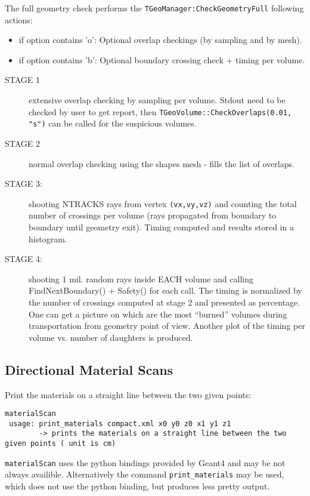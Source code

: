 The full geometry check performs the \texttt{TGeoManager:CheckGeometryFull} following actions:
\begin{itemize}
\item if option contains 'o': Optional overlap checkings (by sampling and by mesh).
\item if option contains 'b': Optional boundary crossing check + timing per volume.
\end{itemize}
\begin{description}
\item[STAGE 1] extensive overlap checking by sampling per volume. Stdout need to be checked by user to get report, then \texttt{TGeoVolume::CheckOverlaps(0.01, "s")} can be called for the suspicious volumes.
\item[STAGE 2] normal overlap checking using the shapes mesh - fills the list of overlaps.
\item[STAGE 3:] shooting NTRACKS rays from vertex \texttt{(vx,vy,vz)} and counting the total number of crossings per volume (rays propagated from boundary to boundary until geometry exit). Timing computed and results stored in a histogram.
\item[STAGE 4:] shooting 1 mil. random rays inside EACH volume and calling FindNextBoundary() + Safety() for each call. The timing is normalized by the number of crossings computed at stage 2 and presented as percentage. One can get a picture on which are the most ``burned'' volumes during transportation from geometry point of view. Another plot of the timing per volume vs. number of daughters is produced.
\end{description}

\subsection{Directional Material Scans}
\label{sec:dd4hep-manual-directional-material-scans}

Print the materials on a straight line between the two given points:
\begin{verbatim}
materialScan
 usage: print_materials compact.xml x0 y0 z0 x1 y1 z1 
        -> prints the materials on a straight line between the two given points ( unit is cm) 
\end{verbatim}
\texttt{materialScan} uses the python bindings provided by Geant4 and may be not  always availible. Alternatively the command \texttt{print\_materials} may be used, which does not use the python binding, but produces less pretty output.


